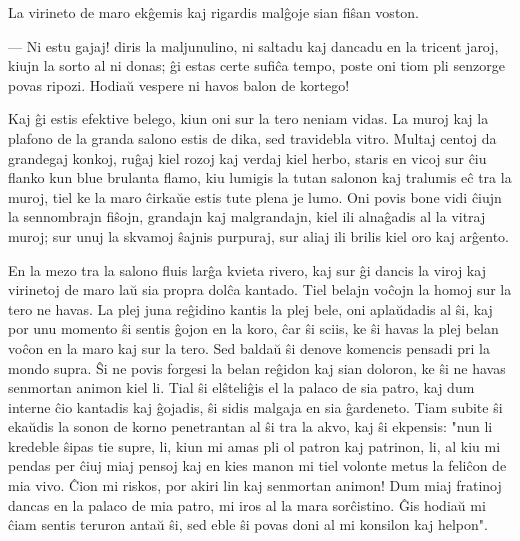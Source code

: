    La virineto de maro ek\^gemis kaj rigardis mal\^goje sian fi\^san
voston.

 --- Ni estu gajaj! diris la maljunulino, ni saltadu kaj dancadu en
la tricent jaroj, kiujn la sorto al ni donas; \^gi estas certe
sufi\^ca tempo, poste oni tiom pli senzorge povas ripozi. Hodia\u u
vespere ni havos balon de kortego!

   Kaj \^gi estis efektive belego, kiun oni sur la tero neniam vidas. La
muroj kaj la plafono de la granda salono estis de dika, sed
travidebla vitro. Multaj centoj da grandegaj konkoj, ru\^gaj kiel
rozoj kaj verdaj kiel herbo, staris en vicoj sur \^ciu flanko kun
blue brulanta flamo, kiu lumigis la tutan salonon kaj tralumis e\^c
tra la muroj, tiel ke la maro \^cirka\u ue estis tute plena je lumo.
Oni povis bone vidi \^ciujn la sennombrajn fi\^sojn, grandajn kaj
malgrandajn, kiel ili alna\^gadis al la vitraj muroj; sur unuj la
skvamoj \^sajnis purpuraj, sur aliaj ili brilis kiel oro kaj
ar\^gento.

   En la mezo tra la salono fluis lar\^ga kvieta rivero, kaj sur \^gi
dancis la viroj kaj virinetoj de maro la\u u sia propra dol\^ca
kantado. Tiel belajn vo\^cojn la homoj sur la tero ne havas. La plej
juna re\^gidino kantis la plej bele, oni apla\u udadis al \^si, kaj
por unu momento \^si sentis \^gojon en la koro, \^car \^si sciis, ke
\^si havas la plej belan vo\^con en la maro kaj sur la tero. Sed
balda\u u \^si denove komencis pensadi pri la mondo supra. \^Si ne
povis forgesi la belan re\^gidon kaj sian doloron, ke \^si ne havas
senmortan animon kiel li. Tial \^si el\^steli\^gis el la palaco de
sia patro, kaj dum interne \^cio kantadis kaj \^gojadis, \^si sidis
malgaja en sia \^gardeneto. Tiam subite \^si eka\u udis la sonon de
korno penetrantan al \^si tra la akvo, kaj \^si ekpensis: "nun li
kredeble \^sipas tie supre, li, kiun mi amas pli ol patron kaj
patrinon, li, al kiu mi pendas per \^ciuj miaj pensoj kaj en kies
manon mi tiel volonte metus la feli\^con de mia vivo. \^Cion mi
riskos, por akiri lin kaj senmortan animon! Dum miaj fratinoj dancas
en la palaco de mia patro, mi iros al la mara sor\^cistino. \^Gis
hodia\u u mi \^ciam sentis teruron anta\u u \^si, sed eble \^si
povas doni al mi konsilon kaj helpon".


